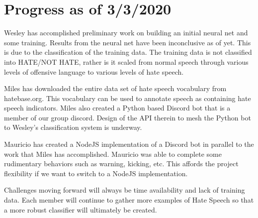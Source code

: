 \documentclass[conference]{sig-alternate-05-2015}
\begin{document}
\section{Progress as of 3/3/2020}

Wesley has accomplished preliminary work on building an initial neural net and some training.  Results from the neural net have been inconclusive as of yet.  This is due to the classification of the training data.  The training data is not classified into HATE/NOT HATE, rather is it scaled from normal speech through various levels of offensive language to various levels of hate speech.

Miles has downloaded the entire data set of hate speech vocabulary from hatebase.org.  This vocabulary can be used to annotate speech as containing hate speech indicators.  Miles also created a Python based Discord bot that is a member of our group discord.  Design of the API therein to mesh the Python bot to Wesley's classification system is underway.

Mauricio has created a NodeJS implementation of a Discord bot in parallel to the work that Miles has accomplished.  Mauricio was able to complete some rudimentary behaviors such as warning, kicking, etc.  This affords the project flexibility if we want to switch to a NodeJS implementation.

Challenges moving forward will always be time availability and lack of training data.  Each member will continue to gather more examples of Hate Speech so that a more robust classifier will ultimately be created.  



\end{document}
